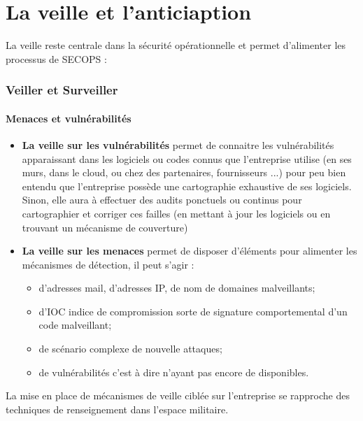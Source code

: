 \section{La veille et l'anticiaption}

La veille reste centrale dans la sécurité opérationnelle et permet d'alimenter les processus de SECOPS :

\begin{frame}
\frametitle<presentation>{Veiller et Surveiller}
\framesubtitle<presentation>{Menaces et vulnérabilités}
\begin{itemize}
  \item\textbf{ La veille sur les vulnérabilités} permet de connaitre les vulnérabilités apparaissant dans les logiciels ou codes connus que l'entreprise utilise (en ses murs, dans le cloud, ou chez des partenaires, fournisseurs ...) pour peu bien entendu que l'entreprise possède une cartographie exhaustive de ses logiciels. Sinon, elle aura à effectuer des audits ponctuels ou continus pour cartographier et corriger ces failles (en mettant à jour les logiciels ou en trouvant un mécanisme de couverture)
  \item  \textbf{La veille sur les menaces} permet de disposer d'éléments pour alimenter les mécanismes de détection, il peut s'agir :
\begin{itemize}
  \item  d'adresses mail, d'adresses IP, de nom de domaines malveillants;
  \item  d'IOC indice de compromission sorte de signature comportemental d'un code malveillant;
  \item de scénario complexe de nouvelle attaques;
  \item de vulnérabilités  c'est à dire n'ayant pas encore de  disponibles.
\end{itemize}
\end{itemize}
\end{frame}

La mise en place de mécanismes de veille ciblée sur l'entreprise se rapproche des techniques de renseignement dans l'espace militaire.

